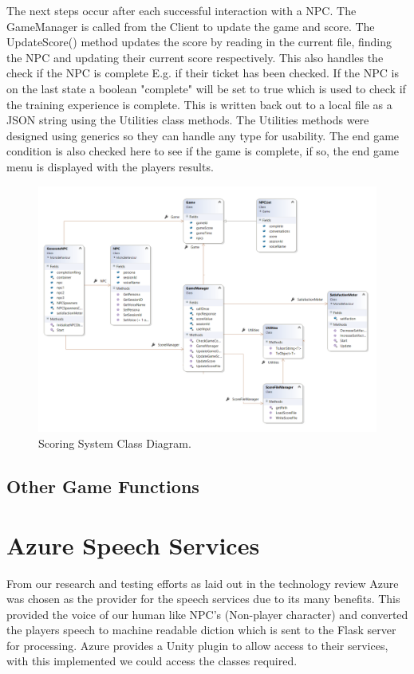The next steps occur after each successful interaction with a NPC. The GameManager is called from the Client to update the game and score. The UpdateScore() method updates the score by reading in the current file, finding the NPC and updating their current score respectively. This also handles the check if the NPC is complete E.g. if their ticket has been checked. If the NPC is on the last state a boolean "complete" will be set to true which is used to check if the training experience is complete. This is written back out to a local file as a JSON string using the Utilities class methods. The Utilities methods were designed using generics so they can handle any type for usability. The end game condition is also checked here to see if the game is complete, if so, the end game menu is displayed with the players results.

\begin{figure}[h!]
	\caption{Scoring System Class Diagram.}
	\label{image:Scoring}
	\centering
	\includegraphics[width=1\textwidth]{Images/ClassDiagram Scoring.png}
\end{figure}

\subsection{Other Game Functions}

\section{Azure Speech Services}
From our research and testing efforts as laid out in the technology review Azure was chosen as the provider for the speech services due to its many benefits. This provided the voice of our human like NPC's (Non-player character) and converted the players speech to machine readable diction which is sent to the Flask server for processing. Azure provides a Unity plugin to allow access to their services, with this implemented we could access the classes required.

